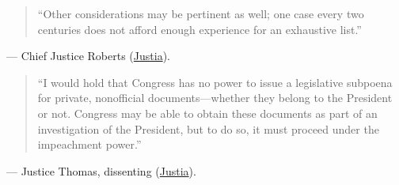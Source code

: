 \documentclass[12pt]{article}
\begin{document}
\begin{quote}
``Other considerations may be pertinent as well; one case every two centuries does not afford enough experience for an exhaustive list.''
\end{quote}
\noindent --- Chief Justice Roberts (\href{https://supreme.justia.com/cases/federal/us/591/19-715/}{Justia}).

\begin{quote}
``I would hold that Congress has no power to issue a legislative subpoena for private, nonofficial documents---whether they belong to the President or not. Congress may be able to obtain these documents as part of an investigation of the President, but to do so, it must proceed under the impeachment power.''
\end{quote}
\noindent --- Justice Thomas, dissenting (\href{https://supreme.justia.com/cases/federal/us/591/19-715/}{Justia}).
\end{document}
